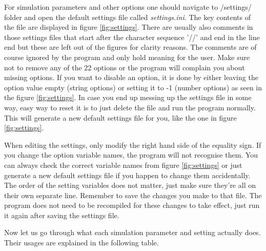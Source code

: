 \documentclass[english,12pt,a4paper,pdftex,sci,utf8]{aaltothesis}
\begin{document}
\par For simulation parameters and other options one should navigate to /settings/ folder and open the default settings file called \textit{settings.ini}. The key contents of the file are displayed in figure \ref{fig:settings}. There are usually also comments in those settings files that start after the character sequence '//' and end in the line end but these are left out of the figures for clarity reasons. The comments are of course ignored by the program and only hold meaning for the user. Make sure not to remove any of the 22 options or the program will complain you about missing options. If you want to disable an option, it is done by either leaving the option value empty (string options) or setting it to -1 (number options) as seen in the figure \ref{fig:settings}. In case you end up messing up the settings file in some way, easy way to reset it is to just delete the file and run the program normally. This will generate a new default settings file for you, like the one in figure \ref{fig:settings}.
\par When editing the settings, only modify the right hand side of the equality sign. If you change the option variable names, the program will not recognise them. You can always check the correct variable names from figure \ref{fig:settings} or just generate a new default settings file if you happen to change them accidentally. 
The order of the setting variables does not matter, just make sure they're all on their own separate line. Remember to save the changes you make to that file. The program does not need to be recompiled for these changes to take effect, just run it again after saving the settings file.
\par Now let us go through what each simulation parameter and setting actually does. Their usages are explained in the following table.
\end{document}
